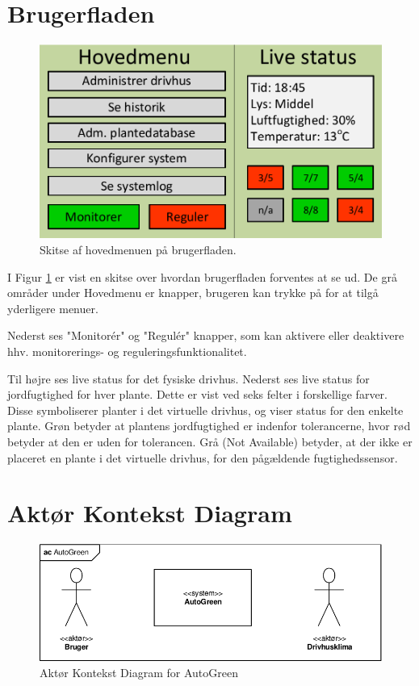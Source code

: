 \section{Brugerfladen}
\begin{figure}[h]
\centering
\includegraphics[width=\textwidth - 3 cm]{../fig/gui_skitse}
\caption{Skitse af hovedmenuen på brugerfladen.}
\label{fig:gui_skitse}
\end{figure}

I Figur \ref{fig:gui_skitse} er vist en skitse over hvordan brugerfladen forventes at se ud. De grå områder under Hovedmenu er knapper, brugeren kan trykke på for at tilgå yderligere menuer. 

Nederst ses "Monitorér" og "Regulér" knapper, som kan aktivere eller deaktivere hhv. monitorerings- og reguleringsfunktionalitet. 

Til højre ses live status for det fysiske drivhus. Nederst ses live status for jordfugtighed for hver plante. Dette er vist ved seks felter i forskellige farver. Disse symboliserer planter i det virtuelle drivhus, og viser status for den enkelte plante. Grøn betyder at plantens jordfugtighed er indenfor tolerancerne, hvor rød betyder at den er uden for tolerancen. Grå (Not Available) betyder, at der ikke er placeret en plante i det virtuelle drivhus, for den pågældende fugtighedssensor. 

\section{Aktør Kontekst Diagram} 
\begin{figure}[h]
\centering 
\includegraphics[width={\textwidth}, trim=0 0 0 0, clip=true] {../fig/Aktoer_Kontekst_Diagram.pdf}
\caption{Aktør Kontekst Diagram for AutoGreen}
\label{fig:aktoer_kontekst_diagram}
\end{figure}

